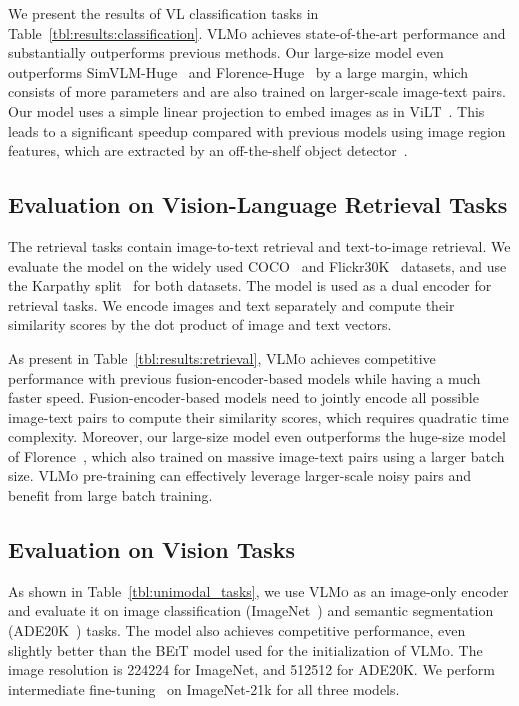 \documentclass{article}
\newcommand\our{\textsc{VLMo}}
\begin{document}
We present the results of VL classification tasks in Table~\ref{tbl:results:classification}. 
\our{} achieves state-of-the-art performance and substantially outperforms previous methods.
Our large-size model even outperforms SimVLM-Huge~\citep{simvlm} and Florence-Huge~\citep{florence} by a large margin, which consists of more parameters and are also trained on larger-scale image-text pairs.
Our model uses a simple linear projection to embed images as in ViLT~\citep{vilt}.
This leads to a significant speedup compared with previous models using image region features, which are extracted by an off-the-shelf object detector~\citep{vilbert,vl-bert,uniter,villa,unimo,vinvl}. 

\subsection{Evaluation on Vision-Language Retrieval Tasks}
\label{sec:exp:retrieval}

The retrieval tasks contain image-to-text retrieval and text-to-image retrieval. 
We evaluate the model on the widely used COCO~\citep{coco} and Flickr30K~\citep{flickr30k} datasets, and use the Karpathy split~\citep{karpathysplit} for both datasets.
The model is used as a dual encoder for retrieval tasks.
We encode images and text separately and compute their similarity scores by the dot product of image and text vectors.

As present in Table~\ref{tbl:results:retrieval}, \our{} achieves competitive performance with previous fusion-encoder-based models while having a much faster speed. 
Fusion-encoder-based models need to jointly encode all possible image-text pairs to compute their similarity scores, which requires quadratic time complexity.
Moreover, our large-size model even outperforms the huge-size model of Florence~\citep{florence}, which also trained on massive image-text pairs using a larger batch size.
\our{} pre-training can effectively leverage larger-scale noisy pairs and benefit from large batch training. 


\subsection{Evaluation on Vision Tasks}

As shown in Table~\ref{tbl:unimodal_tasks}, we use \our{} as an image-only encoder and evaluate it on image classification (ImageNet~\cite{imagenet}) and semantic segmentation (ADE20K~\cite{ade20k}) tasks.
The model also achieves competitive performance, even slightly better than the \textsc{BEiT} model used for the initialization of \our{}.
The image resolution is 224224 for ImageNet, and 512512 for ADE20K.
We perform intermediate fine-tuning~\citep{beit} on ImageNet-21k for all three models.
\end{document}
